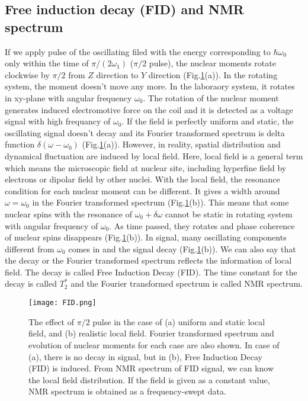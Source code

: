 \subsection{Free induction decay (FID) and NMR spectrum}
If we apply pulse of the oscillating filed with the energy corresponding to $\hbar\omega_0$ only within the time of $\pi/(2\omega_1)$ ($\pi/2$ pulse),
the nuclear moments rotate clockwise by $\pi/2$ from $Z$ direction to $Y$ direction (Fig.\ref{FID}(a)).
In the rotating system, the moment doesn't move any more.
In the laboraory system, it rotates in xy-plane with angular frequency $\omega_0$.
The rotation of the nuclear moment generates induced electromotive force on the coil and it is detected as a voltage signal with high frequancy of $\omega_0$.
If the field is perfectly uniform and static, the oscillating signal doesn't decay and its Fourier transformed spectrum is delta function $\delta(\omega-\omega_0)$ (Fig.\ref{FID}(a)).
However, in reality, spatial distribution and dynamical fluctuation are induced by local field.
Here, local field is a general term which means the microscopic field at nuclear site, including hyperfine field by electrons or dipolar field by other nuclei.
With the local field, the resonance condition for each nuclear moment can be different.
It gives a width around $\omega = \omega_0$ in the Fourier transformed spectrum (Fig.\ref{FID}(b)).
This means that some nuclear spins with the resonance of $\omega_0 + \delta\omega$ cannot be static in rotating system with angular frequency of $\omega_0$.
As time passed, they rotates and phase coherence of nuclear spins disappears (Fig.\ref{FID}(b)).
In signal, many oscillating components different from $\omega_0$ comes in and the signal decay (Fig.\ref{FID}(b)).
We can also say that the decay or the Fourier transformed spectrum reflects the information of local field.
The decay is called Free Induction Decay (FID).
The time constant for the decay is called $T^*_2$ and the Fourier transformed spectrum is called NMR spectrum.

\begin{figure}
  \centering
  \texttt{[image: FID.png]}
  \caption{The effect of $\pi/2$ pulse in the case of (a) uniform and static local field, and (b) realistic local field.
  Fourier transformed spectrum and evolution of nuclear moments for each case are also shown.
  In case of (a), there is no decay in signal, but in (b), Free Induction Decay (FID) is induced.
  From NMR spectrum of FID signal, we can know the local field distribution.
  If the field is given as a constant value, NMR spectrum is obtained as a frequency-swept data.}
  \label{FID}
\end{figure}

